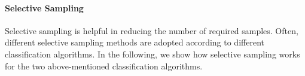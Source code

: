 


\paragraph{Selective Sampling} \label{subsec:active:learning}
Selective sampling is helpful in reducing the number of required samples. 
Often, different selective sampling methods are adopted according to different classification algorithms. 
In the following, we show how selective sampling works for the two above-mentioned classification algorithms. %

